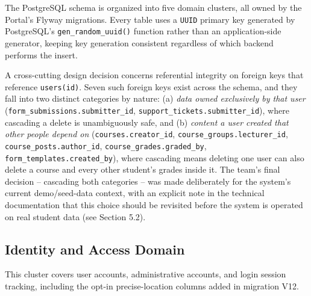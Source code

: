 \documentclass[12pt,a4paper]{report}
\begin{document}
The PostgreSQL schema is organized into five domain clusters, all owned
by the Portal's Flyway migrations. Every table uses a \texttt{UUID}
primary key generated by PostgreSQL's \texttt{gen\_random\_uuid()}
function rather than an application-side generator, keeping key
generation consistent regardless of which backend performs the insert.

A cross-cutting design decision concerns referential integrity on
foreign keys that reference \texttt{users(id)}. Seven such foreign keys
exist across the schema, and they fall into two distinct categories by
nature: (a) \emph{data owned exclusively by that user}
(\texttt{form\_submissions.submitter\_id},
\texttt{support\_tickets.submitter\_id}), where cascading a delete is
unambiguously safe, and (b) \emph{content a user created that other
people depend on} (\texttt{courses.creator\_id},
\texttt{course\_groups.lecturer\_id}, \texttt{course\_posts.author\_id},
\texttt{course\_grades.graded\_by}, \texttt{form\_templates.created\_by}),
where cascading means deleting one user can also delete a course and
every other student's grades inside it. The team's final decision --
cascading both categories -- was made deliberately for the system's
current demo/seed-data context, with an explicit note in the technical
documentation that this choice should be revisited before the system is
operated on real student data (see Section 5.2).

\subsection{Identity and Access Domain}

This cluster covers user accounts, administrative accounts, and login
session tracking, including the opt-in precise-location columns added
in migration V12.
\end{document}
